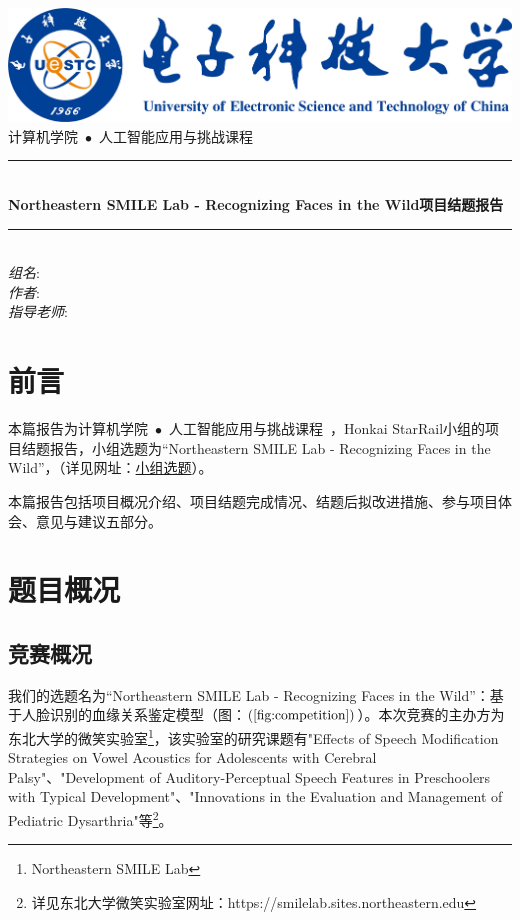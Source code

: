 \documentclass[UTF8]{ctexart}
\newcommand{\HRule}{\rule{\linewidth}{0.5mm}}
\begin{document}
\begin{titlepage}
\begin{center}
\includegraphics[width=\textwidth]{UESTC-Logo}\\[2cm]
\textsc{\LARGE 计算机学院~$\bullet$~人工智能应用与挑战课程~}\\[1.5cm]
\HRule \\[0.4cm]
{ \huge \bfseries Northeastern SMILE Lab - Recognizing Faces in the Wild项目结题报告\\[0.4cm] }

\HRule \\[1.5cm]
\noindent
\emph{组名}:\quad
{}\\
\emph{作者}:\quad
{}\footnotemark
{}\footnotemark
{}\footnotemark\\
\emph{指导老师}:\quad
{}
\end{center}
\end{titlepage}

\tableofcontents
\newpage

\section{前言}
本篇报告为计算机学院~$\bullet$~人工智能应用与挑战课程~，Honkai StarRail小组的项目结题报告，小组选题为“Northeastern SMILE Lab - Recognizing Faces in the Wild”，（详见网址：\href{https://www.kaggle.com/competitions/recognizing-faces-in-the-wild}{小组选题}）。

本篇报告包括项目概况介绍、项目结题完成情况、结题后拟改进措施、参与项目体会、意见与建议五部分。
\section{题目概况}
\subsection{竞赛概况}
我们的选题名为“Northeastern SMILE Lab - Recognizing Faces in the Wild”：基于人脸识别的血缘关系鉴定模型（图：$\left(\ref{fig:competition}\right)$）。本次竞赛的主办方为东北大学的微笑实验室\footnote{Northeastern SMILE Lab}，该实验室的研究课题有"Effects of Speech Modification Strategies on Vowel Acoustics for Adolescents with Cerebral Palsy"、"Development of Auditory-Perceptual Speech Features in Preschoolers with Typical Development"、"Innovations in the Evaluation and Management of Pediatric Dysarthria"等\footnote{详见东北大学微笑实验室网址：https://smilelab.sites.northeastern.edu}。
\end{document}
